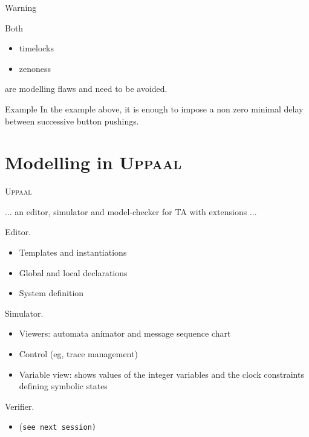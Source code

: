 \documentclass{beamer}
\def\dgold#1{{\darkgoldenrod #1}}
\def\dkb#1{{\blue #1}}
\def\uppaal{\textsc{Uppaal}}
\begin{document}
\begin{slide}{Warning}
\small

Both 
\begin{itemize}
\item timelocks
\item zenoness
\end{itemize}
are \dkb{modelling flaws} and need to be avoided.


\begin{block}{Example}
In the example above, it is enough to impose a non zero minimal delay  between successive button pushings.
\end{block}

\end{slide}




\section{Modelling in \uppaal}
\begin{slide}{\uppaal}
\small

... an \dkb{editor},  \dkb{simulator} and \dkb{model-checker} for TA with \dkb{extensions} ...

\dkb{Editor.}
\begin{itemize}
\item \dgold{Templates} and \dgold{instantiations}
\item Global and local \dgold{declarations}
\item \dgold{System definition}
\end{itemize}

\dkb{Simulator.}
\begin{itemize}
\item Viewers: \dgold{automata animator} and \dgold{message sequence chart}
\item Control (eg, \dgold{trace} management)
\item Variable view: shows values of the integer variables and the clock constraints defining symbolic states
\end{itemize}

\dkb{Verifier.}
\begin{itemize}
\item (\texttt{see next session)}
\end{itemize}

\end{slide}
\end{document}

